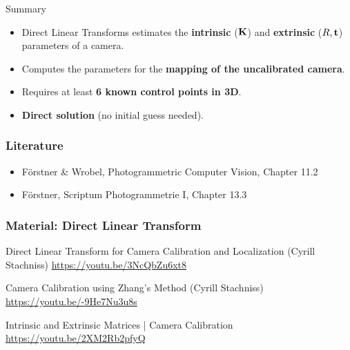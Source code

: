 \begin{frame}{Summary}
    \begin{itemize}
        \item Direct Linear Transforms estimates the \textbf{intrinsic} ($\boldsymbol{\mathbf{K}}$) and \textbf{extrinsic} ($R, \boldsymbol{\mathbf{t}}$) parameters of a camera.
        \item Computes the parameters for the \textbf{mapping of the uncalibrated camera}.
        \item Requires at least \textbf{6 known control points in 3D}.
        \item \textbf{Direct solution} (no initial guess needed).
    \end{itemize}
\end{frame}

\begin{frame}
  \frametitle{Literature}
  \begin{itemize}
    \item Förstner \& Wrobel, Photogrammetric Computer Vision, Chapter 11.2
    \item Förstner, Scriptum Photogrammetrie I, Chapter 13.3
  \end{itemize}
\end{frame}

\begin{frame}
  \frametitle{Material: Direct Linear Transform}

  Direct Linear Transform for Camera Calibration and Localization (Cyrill Stachniss)
  \url{https://youtu.be/3NcQbZu6xt8}

  Camera Calibration using Zhang's Method (Cyrill Stachniss)
  \url{https://youtu.be/-9He7Nu3u8s}

  Intrinsic and Extrinsic Matrices | Camera Calibration
  \url{https://youtu.be/2XM2Rb2pfyQ}

\end{frame}
